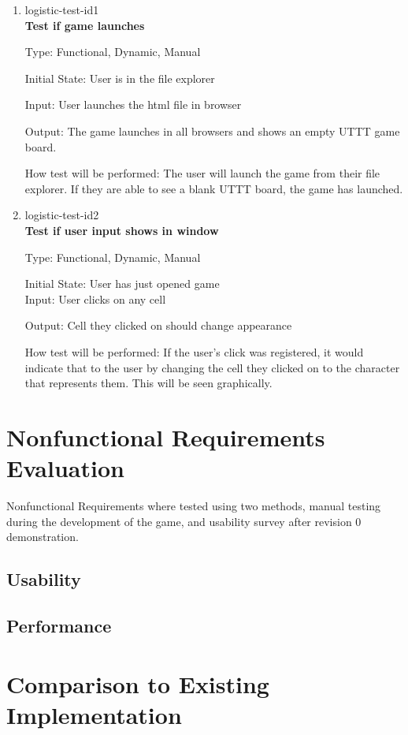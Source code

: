 \documentclass[12pt, titlepage]{article}
\begin{document}
\begin{enumerate}

\item{logistic-test-id1\\}
\textbf{Test if game launches}

Type: Functional, Dynamic, Manual
					
Initial State: User is in the file explorer
					
Input: User launches the html file in browser
					
Output: The game launches in all browsers and shows an empty UTTT game board.
					
How test will be performed: The user will launch the game from their file
explorer. If they are able to see a blank UTTT board, the game has launched.

\item{logistic-test-id2\\}
\textbf{Test if user input shows in window}

Type: Functional, Dynamic, Manual
					
Initial State: User has just opened game\\ %
					
Input: User clicks on any cell
					
Output: Cell they clicked on should change appearance
					
How test will be performed: If the user's click was registered, it would
indicate that to the user by changing the cell they clicked on to the
character that represents them. This will be seen graphically.

\end{enumerate}
\section{Nonfunctional Requirements Evaluation}
Nonfunctional Requirements where tested using two methods, manual testing during the 
development of the game, and usability survey after revision 0 demonstration.
\subsection{Usability}
		
\subsection{Performance}

	
\section{Comparison to Existing Implementation}	
\end{document}
